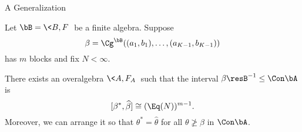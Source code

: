 \documentclass[xcolor=dvipsnames,9pt,hide notes]{beamer}
\begin{document}
\begin{frame}[fragile,label=OAextension2,shrink=5]{A Generalization}

\begin{theorem}
Let $\bB = \<B, F\>$ be a finite algebra. Suppose
\[
\beta = \Cg^{\bB}((a_1, b_1), \dots, (a_{K-1},b_{K-1}))
\]
has $m$ blocks and fix $N<\infty$.

\vskip3mm

There exists an overalgebra $\<A, F_A\>$
such that the interval $\beta\resB^{-1} \leq \Con \bA$ is 
\[
[\beta^*, \widehat{\beta}] \cong (\Eq (N))^{m-1}.
\]
Moreover, we can arrange it so that $\theta^* = \widehat{\theta}$ for all $\theta \ngeq \beta$ in $\Con \bA$.
\end{theorem}




\end{frame}
\end{document}

